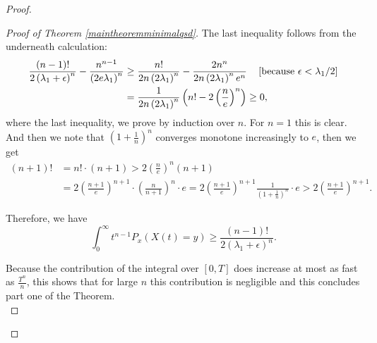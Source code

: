 \documentclass[12pt,a4paper]{scrartcl}
\numberwithin{equation}{section}
\begin{document}
\begin{proof}
\begin{proof}[Proof of Theorem \ref{maintheoremminimalqsd}]
The last inequality follows from the underneath calculation:
\begin{align*}
\frac{\left(n-1\right)!}{2\left(\lambda_1+\epsilon\right)^n} - \frac{n^{n-1}}{\left(2e\lambda_1\right)^n} &\geq \frac{n!}{2n\left(2\lambda_1\right)^n} - \frac{2n^n}{2n\left(2\lambda_1\right)^n e^n} \quad \left[\textnormal{because } \epsilon < \lambda_1/2 \right]\\
&= \frac{1}{2n \left(2 \lambda_1 \right)^n} \left(n! - 2\left(\frac{n}{e}\right)^n \right) \geq 0,
\end{align*}
where the last inequality, we prove by induction over $n$. For $n = 1$ this is clear. And then we note that $\left(1+\frac{1}{n} \right)^n$ converges monotone increasingly to $e$, then we get
\begin{align*}
\left(n+1\right)! &= n! \cdot \left(n+1\right) > 2 \left( \frac{n}{e} \right)^n \left(n+1\right) \\
&= 2\left(\frac{n+1}{e} \right)^{n+1} \cdot \left(\frac{n}{n+1}\right)^n \cdot e = 2\left(\frac{n+1}{e} \right)^{n+1} \frac{1}{\left(1 + \frac{1}{n} \right)^n} \cdot e > 2\left(\frac{n+1}{e} \right)^{n+1}.
\end{align*}

Therefore, we have
\begin{equation} \label{eq:increasesfast}
\int_0^{\infty} t^{n-1} P_x\left(X\left(t\right)=y \right) \geq \frac{\left(n-1\right)!}{2\left(\lambda_1+\epsilon\right)^n}.
\end{equation}

Because the contribution of the integral over $\left[0,T\right]$ does increase at most as fast as $\frac{T^n}{n}$, this shows that for large $n$ this contribution is negligible and this concludes part one of the Theorem. \\[2ex]


\end{proof}
\end{proof}
\end{document}

